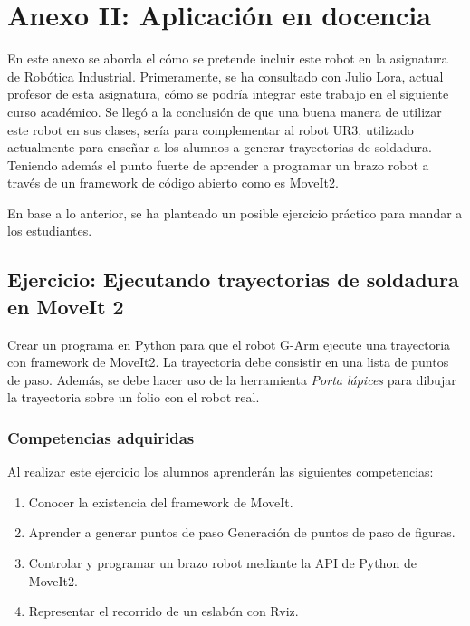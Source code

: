\chapter*{Anexo II: Aplicación en docencia}
\label{cap:anexoii}

\noindent En este anexo se aborda el cómo se pretende incluir este robot en la asignatura de Robótica Industrial. Primeramente, 
se ha consultado con Julio Lora, actual profesor de esta asignatura, cómo se podría integrar este trabajo en el siguiente curso académico. Se llegó 
a la conclusión de que una buena manera de utilizar este robot en sus clases, sería para complementar al robot UR3, utilizado actualmente 
para enseñar a los alumnos a generar trayectorias de soldadura. Teniendo además el punto fuerte de aprender a programar un brazo robot a través de un framework 
de código abierto como es MoveIt2.  

En base a lo anterior, se ha planteado un posible ejercicio práctico para mandar a los estudiantes.

\section*{Ejercicio: Ejecutando trayectorias de soldadura en MoveIt 2}
\noindent Crear un programa en Python para que el robot G-Arm ejecute una trayectoria con framework de MoveIt2. La trayectoria debe consistir 
en una lista de puntos de paso. Además, se debe hacer uso de la herramienta \textit{Porta lápices} para dibujar la trayectoria sobre un folio 
con el robot real. 

\subsection*{Competencias adquiridas}
\noindent Al realizar este ejercicio los alumnos aprenderán las siguientes competencias:
\begin{enumerate}
    \item Conocer la existencia del framework de MoveIt.
    \item Aprender a generar puntos de paso Generación de puntos de paso de figuras.
    \item Controlar y programar un brazo robot mediante la API de Python de MoveIt2.
    \item Representar el recorrido de un eslabón con Rviz.    
\end{enumerate}

\newpage
